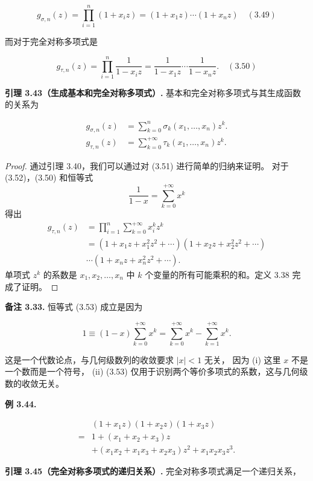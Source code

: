 \documentclass[a4paper]{ctexart}
\begin{document}
{\[
g_{\sigma, n}(z) = \prod_{i=1}^n (1 + x_i z) = (1 + x_1 z) \cdots (1 + x_n z) \quad (3.49)
\]

而对于完全对称多项式是

\[
g_{\tau, n}(z) = \prod_{i=1}^n \frac{1}{1 - x_i z} = \frac{1}{1 - x_1 z} \cdots \frac{1}{1 - x_n z}. \quad (3.50)
\]

\noindent \textbf{引理 3.43（生成基本和完全对称多项式）.} 基本和完全对称多项式与其生成函数的关系为

\begin{align*}
g_{\sigma, n}(z) &= \sum_{k=0}^n \sigma_k(x_1, \ldots, x_n) z^k. \\
g_{\tau, n}(z) &= \sum_{k=0}^{+\infty} \tau_k(x_1, \ldots, x_n) z^k.
\tag{3.52}
\end{align*}

\begin{proof}
通过引理 3.40，我们可以通过对 (3.51) 进行简单的归纳来证明。
对于 (3.52)，(3.50) 和恒等式
\[
  \frac{1}{1 - x} = \sum_{k=0}^{+\infty} x^k
\]
得出
\begin{align*}
  g_{\tau, n}(z) &= \prod_{i=1}^n \sum_{k=0}^{+\infty} x_i^k z^k \\
  &= (1 + x_1 z + x_1^2 z^2 + \cdots) \left(1 + x_2 z + x_2^2 z^2 + \cdots\right) \\
  &\cdots \left(1 + x_n z + x_n^2 z^2 + \cdots\right).
\end{align*}
单项式 $z^k$ 的系数是 $x_1, x_2, \ldots, x_n$ 中 $k$ 
个变量的所有可能乘积的和。定义 3.38 完成了证明。
\end{proof}

\noindent \textbf{备注 3.33.} 恒等式 (3.53) 成立是因为

\[
1 \equiv (1-x) \sum_{k=0}^{+\infty} x^k 
= \sum_{k=0}^{+\infty} x^k - \sum_{k=1}^{+\infty} x^k.
\]

这是一个代数论点，与几何级数列的收敛要求 $|x|<1$ 无关，
因为 (i) 这里 $x$ 不是一个数而是一个符号，
(ii) (3.53) 仅用于识别两个等价多项式的系数，这与几何级数的收敛无关。

\noindent \textbf{例 3.44.}

\begin{align*}
&\left(1+x_1 z\right)\left(1+x_2 z\right)\left(1+x_3 z\right) \\
=& 1+\left(x_1+x_2+x_3\right) z \\
&+\left(x_1 x_2+x_1 x_3+x_2 x_3\right) z^2+x_1 x_2 x_3 z^3.
\end{align*}

\noindent \textbf{引理 3.45（完全对称多项式的递归关系）.} 完全对称多项式满足一个递归关系，

}
\end{document}
